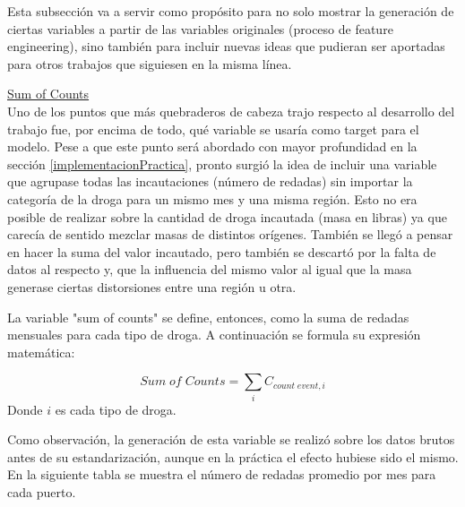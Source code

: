 \documentclass[12pt]{article}
\begin{document}
		Esta subsección va a servir como propósito para no solo mostrar la generación de ciertas variables a partir de las variables originales (proceso de feature engineering), sino también para incluir nuevas ideas que pudieran ser aportadas para otros trabajos que siguiesen en la misma línea.
		
		\underline{Sum of Counts}\\
		Uno de los puntos que más quebraderos de cabeza trajo respecto al desarrollo del trabajo fue, por encima de todo, qué variable se usaría como target para el modelo. Pese a que este punto será abordado con mayor profundidad en la sección \ref{implementacionPractica}, pronto surgió la idea de incluir una variable que agrupase todas las incautaciones (número de redadas) sin importar la categoría de la droga para un mismo mes y una misma región. Esto no era posible de realizar sobre la cantidad de droga incautada (masa en libras) ya que carecía de sentido mezclar masas de distintos orígenes. También se llegó a pensar en hacer la suma del valor incautado, pero también se descartó por la falta de datos al respecto y, que la influencia del mismo valor al igual que la masa generase ciertas distorsiones entre una región u otra.
		
		La variable "sum of counts" se define, entonces, como la suma de redadas mensuales para cada tipo de droga. A continuación se formula su expresión matemática:
		
		$$
		Sum\; of\; Counts = \sum_i C_{count\; event,i}
		$$
		Donde $i$ es cada tipo de droga.
		
		Como observación, la generación de esta variable se realizó sobre los datos brutos antes de su estandarización, aunque en la práctica el efecto hubiese sido el mismo. En la siguiente tabla se muestra el número de redadas promedio por mes para cada puerto.
		
\end{document}
